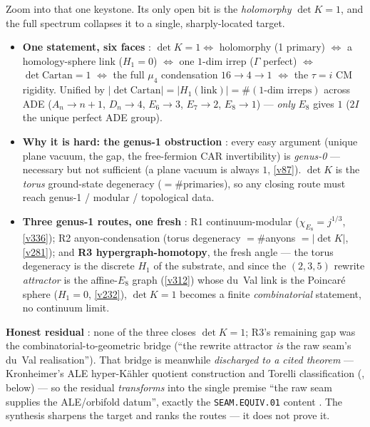 \documentclass[11pt,a4paper]{article}
\begin{document}
\begin{keybox}[The one keystone bit $\det K{=}1$: six faces, the genus-1 obstruction, three routes \mE/\mC/\mO\ (\veri{v344\_detk\_synthesis.py})]
Zoom into that one keystone. Its only open bit is the \emph{holomorphy} $\det K{=}1$, and the full spectrum
collapses it to a single, sharply-located target.
\begin{itemize}\setlength\itemsep{1pt}
\item \textbf{One statement, six faces} \mE: $\det K{=}1\Leftrightarrow$ holomorphy (1 primary) $\Leftrightarrow$
a homology-sphere link ($H_1{=}0$) $\Leftrightarrow$ one $1$-dim irrep ($\Gamma$ perfect) $\Leftrightarrow$
$\det\mathrm{Cartan}{=}1$ $\Leftrightarrow$ the full $\mu_4$ condensation $16{\to}4{\to}1$ $\Leftrightarrow$ the
$\tau{=}i$ CM rigidity. Unified by $|\det\mathrm{Cartan}|=|H_1(\text{link})|=\#(\text{1-dim irreps})$ across ADE
($A_n{\to}n{+}1$, $D_n{\to}4$, $E_6{\to}3$, $E_7{\to}2$, $E_8{\to}1$) --- \emph{only} $E_8$ gives $1$ ($2I$ the
unique perfect ADE group).
\item \textbf{Why it is hard: the genus-1 obstruction} \mE: every easy argument (unique plane vacuum, the gap, the
free-fermion CAR invertibility) is \emph{genus-0} --- necessary but not sufficient (a plane vacuum is always $1$,
\vref{v87}). $\det K$ is the \emph{torus} ground-state degeneracy ($=\#$primaries), so any closing route must reach
genus-1 / modular / topological data.
\item \textbf{Three genus-1 routes, one fresh} \mC: R1 continuum-modular ($\chi_{E_8}{=}j^{1/3}$, \vref{v336});
R2 anyon-condensation (torus degeneracy $=\#$anyons $=|\det K|$, \vref{v281}); and \textbf{R3 hypergraph-homotopy},
the fresh angle --- the torus degeneracy is the discrete $H_1$ of the substrate, and since the $(2,3,5)$ rewrite
\emph{attractor} is the affine-$E_8$ graph (\vref{v312}) whose du~Val link is the Poincar\'e sphere ($H_1{=}0$,
\vref{v232}), $\det K{=}1$ becomes a finite \emph{combinatorial} statement, no continuum limit.
\end{itemize}
\textbf{Honest residual} \mO: none of the three closes $\det K{=}1$; R3's remaining gap was the
combinatorial-to-geometric bridge (``the rewrite attractor \emph{is} the raw seam's du~Val realisation'').
That bridge is meanwhile \emph{discharged to a cited theorem} --- Kronheimer's ALE hyper-K\"ahler quotient
construction and Torelli classification (, below) --- so the residual
\emph{transforms} into the single premise ``the raw seam supplies the ALE/orbifold datum'', exactly the
\texttt{SEAM.EQUIV.01} content \mO. The synthesis sharpens the target and ranks the routes --- it does not prove it.
\end{keybox}
\end{document}
